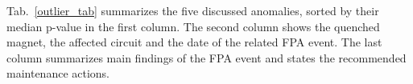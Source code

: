 \documentclass[lettersize,journal]{IEEEtran}
\begin{document}
Tab.~\ref{outlier_tab} summarizes the five discussed anomalies, sorted by their median p-value in the first column.
The second column shows the quenched magnet, the affected circuit and the date of the related FPA event.
The last column summarizes main findings of the FPA event and states the recommended maintenance actions. 
\end{document}
